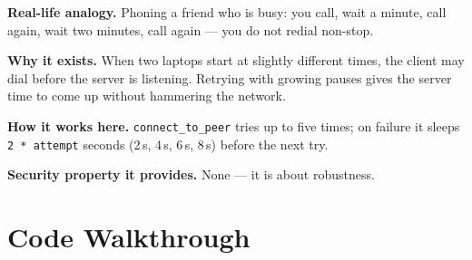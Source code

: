 \documentclass[11pt,a4paper]{article}
\begin{document}
\textbf{Real-life analogy.} Phoning a friend who is busy: you call, wait a
minute, call again, wait two minutes, call again --- you do not redial
non-stop.

\textbf{Why it exists.} When two laptops start at slightly different times, the
client may dial before the server is listening. Retrying with growing pauses
gives the server time to come up without hammering the network.

\textbf{How it works here.} \texttt{connect\_to\_peer} tries up to five times; on
failure it sleeps \texttt{2 * attempt} seconds (2\,s, 4\,s, 6\,s, 8\,s) before
the next try.

\textbf{Security property it provides.} None --- it is about robustness.

\section{Code Walkthrough}
\end{document}
